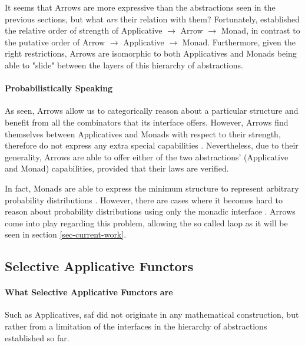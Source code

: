 \documentclass[
  oneside,
  11pt, a4paper,
  footinclude=true,
  headinclude=true,
  cleardoublepage=empty
]{scrbook}
\theoremstyle{definition}
\theoremstyle{definition}
\begin{document}
    It seems that Arrows are more expressive than the abstractions seen in the previous sections, but what \emph{are} their relation with them? Fortunately, \cite{Lindley:2011:IOA:1953652.1954016} established the relative order of strength of Applicative $\rightarrow$ Arrow $\rightarrow$ Monad, in contrast to the putative order of Arrow $\rightarrow$ Applicative $\rightarrow$ Monad. Furthermore, given the right restrictions, Arrows are isomorphic to both Applicatives and Monads being able to "slide" between the layers of this hierarchy of abstractions.
    	        
    	        \paragraph{Probabilistically Speaking}
    	        
    As seen, Arrows allow us to categorically reason about a particular structure and benefit from all the combinators that its interface offers. However, Arrows find themselves between Applicatives and Monads with respect to their strength, therefore do not express any extra special capabilities \citep{Lindley:2011:IOA:1953652.1954016}. Nevertheless, due to their generality, Arrows are able to offer either of the two abstractions' (Applicative and Monad) capabilities, provided that their laws are verified.
    	        
    In fact, Monads are able to express the minimum structure to represent arbitrary probability distributions \citep{jtobin}. However, there are cases where it becomes hard to reason about probability distributions using only the monadic interface \citep{Oliveira2016KeepDC}. Arrows come into play regarding this problem, allowing the so called \gls{laop} \citep{Macedo2012MatricesAA} as it will be seen in section \ref{sec-current-work}.
    	        
	    \subsection{Selective Applicative Functors}
	    
	        \paragraph{What Selective Applicative Functors are}
	       
	Such as Applicatives, \gls{saf} did not originate in any mathematical construction, but rather from a limitation of the interfaces in the hierarchy of abstractions established so far.
	            
\end{document}
